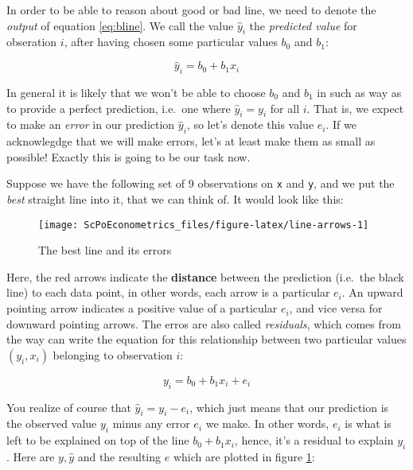 \documentclass[]{book}
\begin{document}
In order to be able to reason about good or bad line, we need to denote
the \emph{output} of equation \eqref{eq:bline}. We call the value
\(\hat{y}_i\) the \emph{predicted value} for obseration \(i\), after
having chosen some particular values \(b_0\) and \(b_1\):

\begin{equation}
\hat{y}_i = b_0 + b_1 x_i \label{eq:abline-pred}
\end{equation}

In general it is likely that we won't be able to choose \(b_0\) and
\(b_1\) in such as way as to provide a perfect prediction, i.e.~one
where \(\hat{y}_i = y_i\) for all \(i\). That is, we expect to make an
\emph{error} in our prediction \(\hat{y}_i\), so let's denote this value
\(e_i\). If we acknowlegdge that we will make errors, let's at least
make them as small as possible! Exactly this is going to be our task
now.

Suppose we have the following set of 9 observations on \texttt{x} and
\texttt{y}, and we put the \emph{best} straight line into it, that we
can think of. It would look like this:

\begin{figure}

{\centering \texttt{[image: ScPoEconometrics\_files/figure-latex/line-arrows-1]} 

}

\caption{The best line and its errors}\label{fig:line-arrows}
\end{figure}

Here, the red arrows indicate the \textbf{distance} between the
prediction (i.e.~the black line) to each data point, in other words,
each arrow is a particular \(e_i\). An upward pointing arrow indicates a
positive value of a particular \(e_i\), and vice versa for downward
pointing arrows. The erros are also called \emph{residuals}, which comes
from the way can write the equation for this relationship between two
particular values \((y_i,x_i)\) belonging to observation \(i\):

\begin{equation}
y_i = b_0 + b_1 x_i + e_i \label{eq:abline}
\end{equation}

You realize of course that \(\hat{y}_i = y_i - e_i\), which just means
that our prediction is the observed value \(y_i\) minus any error
\(e_i\) we make. In other words, \(e_i\) is what is left to be explained
on top of the line \(b_0 + b_1 x_i\), hence, it's a residual to explain
\(y_i\). Here are \(y,\hat{y}\) and the resulting \(e\) which are
plotted in figure \ref{fig:line-arrows}:
\end{document}
